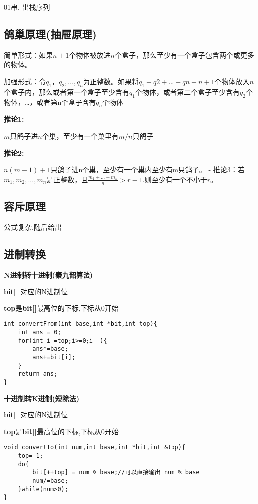 01串, 出栈序列

\subsection{鸽巢原理(抽屉原理)}

 简单形式：如果$n+1$个物体被放进$n$个盒子，那么至少有一个盒子包含两个或更多的物体。

加强形式：令$q_1，q_2,...,q_n$为正整数。如果将$q_1+q2+...+qn-n+1$个物体放入$n$个盒子内，那么或者第一个盒子至少含有$q_1$个物体，或者第二个盒子至少含有$q_2$个物体，…，或者第n个盒子含有$q_n$个物体

\textbf{推论1:}

$m$只鸽子进$n$个巢，至少有一个巢里有$m/n$只鸽子

\textbf{推论2:}

$n(m-1)+1$只鸽子进n个巢，至少有一个巢内至少有m只鸽子。
  - 推论3：若$m_1,m_2,...,m_n$是正整数，且$\frac{m_1+...+m_n}{n}>r-1$.则至少有一个不小于$r$。


\subsection{容斥原理}

公式复杂,随后给出

\subsection{进制转换}

\textbf{N进制转十进制(秦九韶算法)}

\textbf{bit[]} 对应的N进制位

\textbf{top}是\textbf{bit[]}最高位的下标,下标从0开始

\begin{lstlisting}
int convertFrom(int base,int *bit,int top){
    int ans = 0;
    for(int i =top;i>=0;i--){
        ans*=base;
        ans+=bit[i];
    }
    return ans;
}
\end{lstlisting}

\textbf{十进制转K进制(短除法)}

\textbf{bit[]} 对应的N进制位

\textbf{top}是\textbf{bit[]}最高位的下标,下标从0开始

\begin{lstlisting}
void convertTo(int num,int base,int *bit,int &top){
    top=-1;
    do{
        bit[++top] = num % base;//可以直接输出 num % base
        num/=base;
    }while(num>0);
}
\end{lstlisting}
